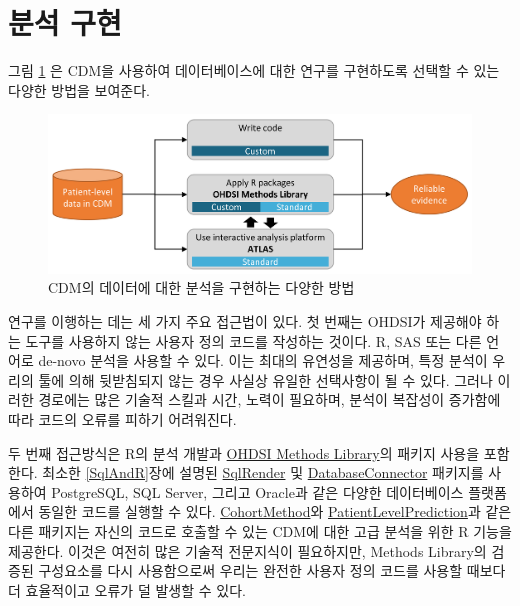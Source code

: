 \documentclass[11pt]{book}
\theoremstyle{definition}
\theoremstyle{definition}
\theoremstyle{definition}
\theoremstyle{remark}
\begin{document}
\section{분석 구현}\label{analysisImplementation}

그림 \ref{fig:implementations} 은 CDM을 사용하여 데이터베이스에 대한
연구를 구현하도록 선택할 수 있는 다양한 방법을 보여준다.

\begin{figure}

{\centering \includegraphics[width=0.9\linewidth]{images/OhdsiAnalyticsTools/implementations} 

}

\caption{CDM의 데이터에 대한 분석을 구현하는 다양한 방법}\label{fig:implementations}
\end{figure}

연구를 이행하는 데는 세 가지 주요 접근법이 있다. 첫 번째는 OHDSI가
제공해야 하는 도구를 사용하지 않는 사용자 정의 코드를 작성하는 것이다.
R, SAS 또는 다른 언어로 de-novo 분석을 사용할 수 있다. 이는 최대의
유연성을 제공하며, 특정 분석이 우리의 툴에 의해 뒷받침되지 않는 경우
사실상 유일한 선택사항이 될 수 있다. 그러나 이러한 경로에는 많은 기술적
스킬과 시간, 노력이 필요하며, 분석이 복잡성이 증가함에 따라 코드의
오류를 피하기 어려워진다.

두 번째 접근방식은 R의 분석 개발과
\href{https://ohdsi.github.io/MethodsLibrary/}{OHDSI Methods Library}의
패키지 사용을 포함한다. 최소한 \ref{SqlAndR}장에 설명된
\href{https://ohdsi.github.io/SqlRender/}{SqlRender} 및
\href{https://ohdsi.github.io/DatabaseConnector/}{DatabaseConnector}
패키지를 사용하여 PostgreSQL, SQL Server, 그리고 Oracle과 같은 다양한
데이터베이스 플랫폼에서 동일한 코드를 실행할 수 있다.
\href{https://ohdsi.github.io/CohortMethod/}{CohortMethod}와
\href{https://ohdsi.github.io/PatientLevelPrediction/}{PatientLevelPrediction}과
같은 다른 패키지는 자신의 코드로 호출할 수 있는 CDM에 대한 고급 분석을
위한 R 기능을 제공한다. 이것은 여전히 많은 기술적 전문지식이 필요하지만,
Methods Library의 검증된 구성요소를 다시 사용함으로써 우리는 완전한
사용자 정의 코드를 사용할 때보다 더 효율적이고 오류가 덜 발생할 수 있다.
\end{document}
